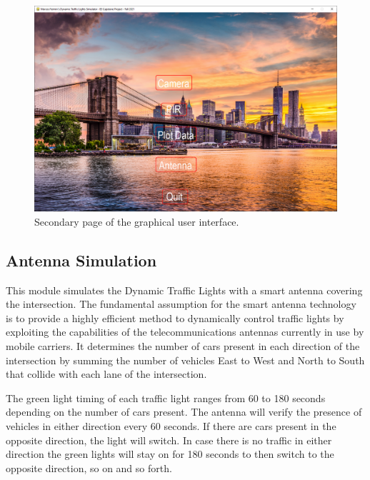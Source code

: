 \documentclass[12pt, a4paper,titlepage]{article}
\begin{document}
\begin{figure}[H]
	\centering
	\includegraphics[width=\linewidth]{images/GUI_2}
	\caption{Secondary page of the graphical user interface.}
	\label{fig:gui2}
\end{figure}

\newpage
\subsection{Antenna Simulation}
\label{subsec_antenna}

This module simulates the Dynamic Traffic Lights with a smart antenna covering the intersection. The fundamental assumption for the smart antenna technology is to provide a highly efficient method to dynamically control traffic lights by exploiting the capabilities of the telecommunications antennas currently in use by mobile carriers. It determines the number of cars present in each direction of the intersection by summing the number of vehicles East to West and North to South that collide with each lane of the intersection.

The green light timing of each traffic light ranges from 60 to 180 seconds depending on the number of cars present. The antenna will verify the presence of vehicles in either direction every 60 seconds. If there are cars present in the opposite direction, the light will switch. In case there is no traffic in either direction the green lights will stay on for 180 seconds to then switch to the opposite direction, so on and so forth.
\end{document}
